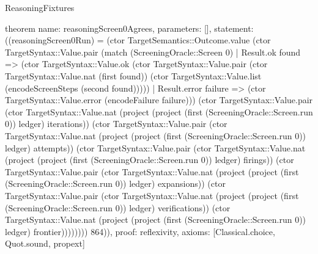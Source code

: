 \begin{lexlean}{ReasoningFixtures}
\begin{semanticmodule}
theorem{
  name: reasoningScreen0Agrees,
  parameters: [],
  statement: ((reasoningScreen0Run) = (ctor TargetSemantics::Outcome.value (ctor TargetSyntax::Value.pair (match (ScreeningOracle::Screen 0)
    | Result.ok found => (ctor TargetSyntax::Value.ok (ctor TargetSyntax::Value.pair (ctor TargetSyntax::Value.nat (first found)) (ctor TargetSyntax::Value.list (encodeScreenSteps (second found)))))
    | Result.error failure => (ctor TargetSyntax::Value.error (encodeFailure failure))) (ctor TargetSyntax::Value.pair (ctor TargetSyntax::Value.nat (project (project (first (ScreeningOracle::Screen.run 0)) ledger) iterations)) (ctor TargetSyntax::Value.pair (ctor TargetSyntax::Value.nat (project (project (first (ScreeningOracle::Screen.run 0)) ledger) attempts)) (ctor TargetSyntax::Value.pair (ctor TargetSyntax::Value.nat (project (project (first (ScreeningOracle::Screen.run 0)) ledger) firings)) (ctor TargetSyntax::Value.pair (ctor TargetSyntax::Value.nat (project (project (first (ScreeningOracle::Screen.run 0)) ledger) expansions)) (ctor TargetSyntax::Value.pair (ctor TargetSyntax::Value.nat (project (project (first (ScreeningOracle::Screen.run 0)) ledger) verifications)) (ctor TargetSyntax::Value.nat (project (project (first (ScreeningOracle::Screen.run 0)) ledger) frontier)))))))) 864)),
  proof: reflexivity{},
  axioms: [Classical.choice, Quot.sound, propext]
}


\end{semanticmodule}
\end{lexlean}

